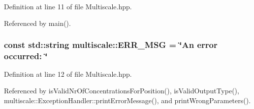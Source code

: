 Definition at line 11 of file Multiscale.\-hpp.



Referenced by main().

\hypertarget{namespacemultiscale_a06490e4e11ef359aa0260f96579ce584}{
\subsubsection[{E\-R\-R\-\_\-\-M\-S\-G}]{\setlength{\rightskip}{0pt plus 5cm}const std\-::string multiscale\-::\-E\-R\-R\-\_\-\-M\-S\-G = \char`\"{}An error occurred\-: \char`\"{}}}\label{namespacemultiscale_a06490e4e11ef359aa0260f96579ce584}


Definition at line 12 of file Multiscale.\-hpp.



Referenced by is\-Valid\-Nr\-Of\-Concentrations\-For\-Position(), is\-Valid\-Output\-Type(), multiscale\-::\-Exception\-Handler\-::print\-Error\-Message(), and print\-Wrong\-Parameters().

